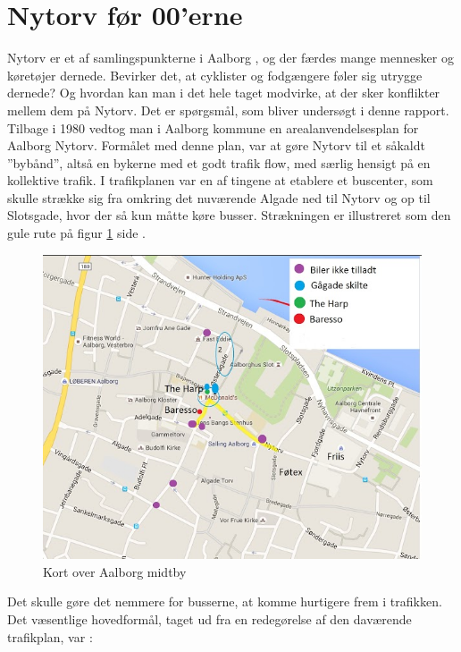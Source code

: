 \section{Nytorv før 00'erne}
\label{sec:nytorv_foer_null}
Nytorv er et af samlingspunkterne i Aalborg , og der færdes mange mennesker og køretøjer dernede. Bevirker det, at cyklister og fodgængere føler sig utrygge dernede? Og hvordan kan man i det hele taget modvirke, at der sker konflikter mellem dem på Nytorv. Det er spørgsmål, som bliver undersøgt i denne rapport.
Tilbage i 1980 vedtog man i Aalborg kommune en arealanvendelsesplan for Aalborg Nytorv. \autocite{arealplan}
Formålet med denne plan, var at gøre Nytorv til et såkaldt ”bybånd”, altså en bykerne med et godt trafik flow, med særlig hensigt på en kollektive trafik. I trafikplanen var en af tingene at etablere et buscenter, som skulle strække sig fra omkring det nuværende Algade ned til Nytorv og op til Slotsgade, hvor der så kun måtte køre busser. Strækningen er illustreret som den gule rute på figur \cref{fig:midtby} side \pageref{fig:midtby}.
\begin{figure}[htbp]
   \centering
   \begin{adjustbox}{max width=\textwidth}
     \includegraphics[scale=0.3]{figures/Billederogfigur/midtby.jpg}
  \end{adjustbox}
   \caption{Kort over Aalborg midtby \autocite{gm2015}}
   \label{fig:midtby}
 \end{figure}
Det skulle gøre det nemmere for busserne, at komme hurtigere frem i trafikken\autocite{arealplan}. Det  væsentlige hovedformål, taget ud fra en redegørelse af den daværende trafikplan, var :
